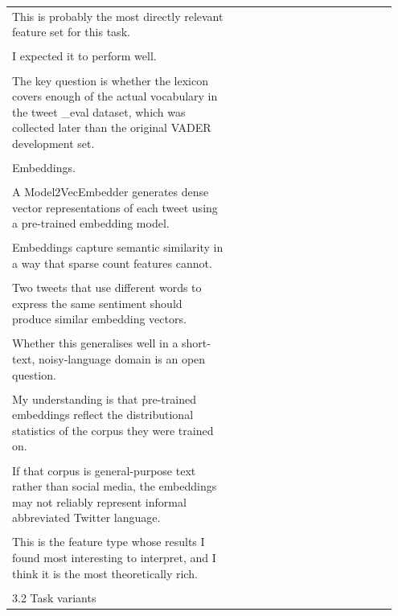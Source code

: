 \documentclass[11pt]{article}
\begin{document}
\begin{longtable}{|p{0.55\linewidth}|p{0.40\linewidth}|}
\hline
\rule{0pt}{3.5cm} & \\
\hline
This is probably the most directly relevant feature set for this task. & \\[2pt]
\hline
\rule{0pt}{3.5cm} & \\
\hline
I expected it to perform well. & \\[2pt]
\hline
\rule{0pt}{3.5cm} & \\
\hline
The key question is whether the lexicon covers enough of the actual vocabulary in the tweet \_eval dataset, which was collected later than the original VADER development set. & \\[2pt]
\hline
\rule{0pt}{3.5cm} & \\
\hline
Embeddings. & \\[2pt]
\hline
\rule{0pt}{3.5cm} & \\
\hline
A Model2VecEmbedder generates dense vector representations of each tweet using a pre-trained embedding model. & \\[2pt]
\hline
\rule{0pt}{3.5cm} & \\
\hline
Embeddings capture semantic similarity in a way that sparse count features cannot. & \\[2pt]
\hline
\rule{0pt}{3.5cm} & \\
\hline
Two tweets that use different words to express the same sentiment should produce similar embedding vectors. & \\[2pt]
\hline
\rule{0pt}{3.5cm} & \\
\hline
Whether this generalises well in a short-text, noisy-language domain is an open question. & \\[2pt]
\hline
\rule{0pt}{3.5cm} & \\
\hline
My understanding is that pre-trained embeddings reflect the distributional statistics of the corpus they were trained on. & \\[2pt]
\hline
\rule{0pt}{3.5cm} & \\
\hline
If that corpus is general-purpose text rather than social media, the embeddings may not reliably represent informal abbreviated Twitter language. & \\[2pt]
\hline
\rule{0pt}{3.5cm} & \\
\hline
This is the feature type whose results I found most interesting to interpret, and I think it is the most theoretically rich. & \\[2pt]
\hline
\rule{0pt}{3.5cm} & \\
\hline
3.2 Task variants & \\[2pt]

\end{longtable}
\end{document}

